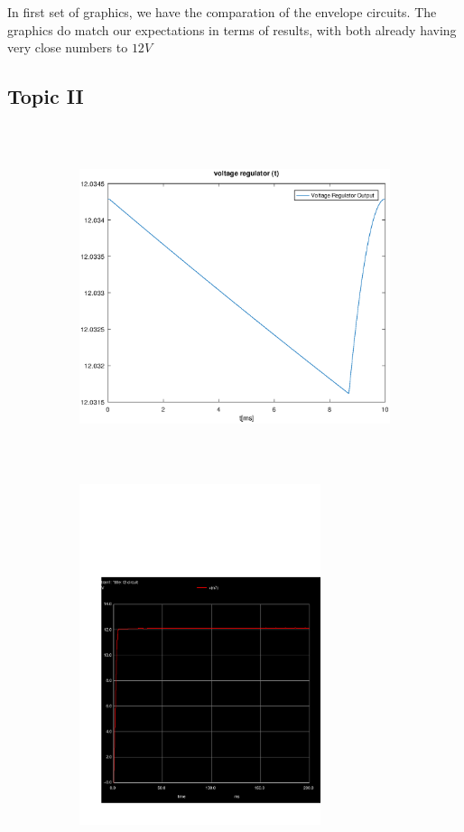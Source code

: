 In first set of graphics, we have the comparation of the envelope circuits. The graphics do match our expectations in terms of results, with both already having very close numbers to $12V$


\subsection{Topic II}
\label{subsec:second_topic_error}
\begin{figure}[H]

\begin{subfigure}{0.5\textwidth}
\includegraphics[width=0.9\linewidth, height=10cm]{output.eps} 
\label{fig:theosecondcompare}
\end{subfigure}
\begin{subfigure}{0.5\textwidth}
\includegraphics[width=0.9\linewidth, height=10cm]{trans2.pdf}
\label{fig:simsecondcompare}
\end{subfigure}

\label{fig:compar2}
\end{figure}

